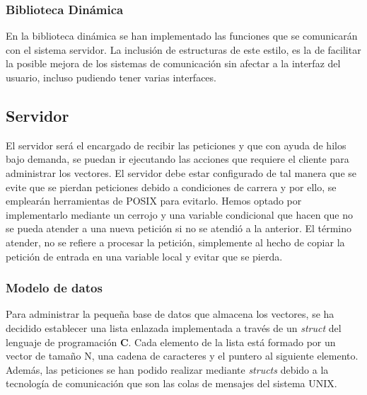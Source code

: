 \documentclass[10pt, spanish, pdftex]{template/UC3M_document}
\begin{document}
\subsubsection{Biblioteca Dinámica}
En la biblioteca dinámica se han implementado las funciones que se comunicarán con el sistema servidor. La inclusión de estructuras de este estilo, es la de facilitar la posible mejora de los sistemas de comunicación sin afectar a la interfaz del usuario, incluso pudiendo tener varias interfaces.

\subsection{Servidor}
El servidor será el encargado de recibir las peticiones y que con ayuda de hilos bajo demanda, se puedan ir ejecutando las acciones que requiere el cliente para administrar los vectores.
El servidor debe estar configurado de tal manera que se evite que se pierdan peticiones debido a condiciones de carrera y por ello, se emplearán herramientas de POSIX para evitarlo. Hemos optado por implementarlo mediante un cerrojo y una variable condicional que hacen que no se pueda atender a una nueva petición si no se atendió a la anterior. El término atender, no se refiere a procesar la petición, simplemente al hecho de copiar la petición de entrada en una variable local y evitar que se pierda.

\subsubsection{Modelo de datos}
Para administrar la pequeña base de datos que almacena los vectores, se ha decidido establecer una lista enlazada implementada a través de un \textit{struct} del lenguaje de programación \textbf{C}. Cada elemento de la lista está formado por un vector de tamaño N, una cadena de caracteres y el puntero al siguiente elemento.
Además, las peticiones se han podido realizar mediante \textit{structs} debido a la tecnología de comunicación que son las colas de mensajes del sistema UNIX.
\end{document}
